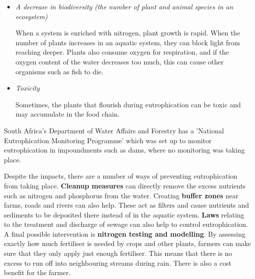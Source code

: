 \begin{itemize}
\item{\textit{A decrease in biodiversity (the number of plant and animal species in an ecosystem)}

When a system is enriched with nitrogen, plant growth is rapid. When the number of plants increases in an aquatic system, they can block light from reaching deeper. Plants also consume oxygen for respiration, and if the oxygen content of the water decreases too much, this can cause other organisms such as fish to die.}

\item{\textit{Toxicity}

Sometimes, the plants that flourish during eutrophication can be toxic and may accumulate in the food chain.}  
\end{itemize}  

\begin{IFact}{
South Africa's Department of Water Affairs and Forestry has a 'National Eutrophication Monitoring Programme' which was set up to monitor eutrophication in impoundments such as dams, where no monitoring was taking place.
}
\end{IFact}

Despite the impacts, there are a number of ways of preventing eutrophication from taking place. \textbf{Cleanup measures} can directly remove the excess nutrients such as nitrogen and phosphorus from the water. Creating \textbf{buffer zones} near farms, roads and rivers can also help. These act as filters and cause nutrients and sediments to be deposited there instead of in the aquatic system. \textbf{Laws} relating to the treatment and discharge of sewage can also help to control eutrophication. A final possible intervention is \textbf{nitrogen testing and modelling}. By assessing exactly how much fertiliser is needed by crops and other plants, farmers can make sure that they only apply just enough fertiliser. This means that there is no excess to run off into neighbouring streams during rain. There is also a cost benefit for the farmer.


